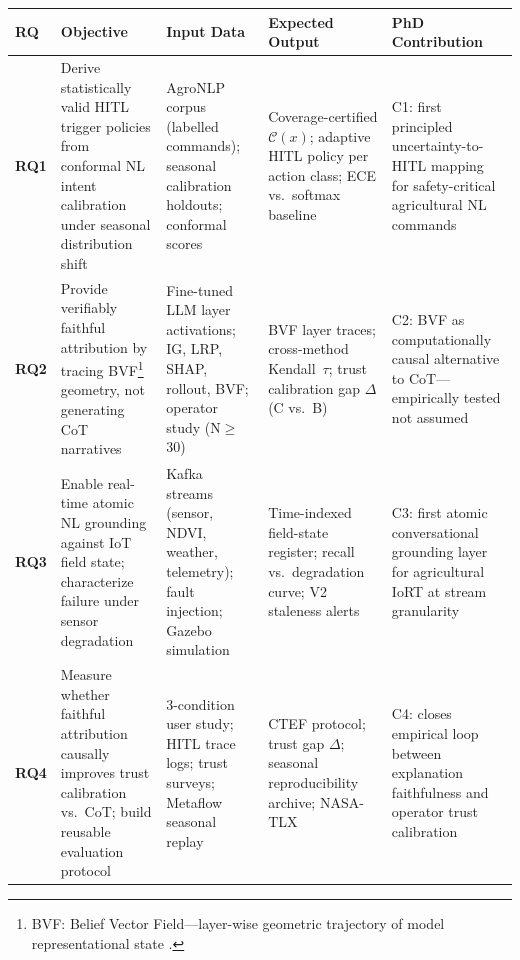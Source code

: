 \documentclass[11pt,a4paper]{article}
\begin{document}
\begin{center}
\setlength{\tabcolsep}{3pt}\scriptsize
\begin{tabularx}{\linewidth}{@{}p{0.48cm}p{2.65cm}p{2.25cm}p{2.55cm}X@{}}
\toprule
\textbf{RQ} & \textbf{Objective} & \textbf{Input Data} & \textbf{Expected Output} & \textbf{PhD Contribution} \\
\midrule
\textbf{RQ1} & Derive statistically valid HITL trigger policies from conformal NL intent calibration under seasonal distribution shift & AgroNLP corpus (labelled commands); seasonal calibration holdouts; conformal scores & Coverage-certified $\mathcal{C}(x)$; adaptive HITL policy per action class; ECE vs.\ softmax baseline & C1: first principled uncertainty-to-HITL mapping for safety-critical agricultural NL commands \\[3pt]
\textbf{RQ2} & Provide verifiably faithful attribution by tracing BVF\footnote{BVF: Belief Vector Field---layer-wise geometric trajectory of model representational state \citep{saha_bvf_2026}.} geometry, not generating CoT narratives & Fine-tuned LLM layer activations; IG, LRP, SHAP, rollout, BVF; operator study (N$\geq$30) & BVF layer traces; cross-method Kendall~$\tau$; trust calibration gap $\Delta$(C vs.\ B) & C2: BVF as computationally causal alternative to CoT---empirically tested not assumed \\[3pt]
\textbf{RQ3} & Enable real-time atomic NL grounding against IoT field state; characterize failure under sensor degradation & Kafka streams (sensor, NDVI, weather, telemetry); fault injection; Gazebo simulation & Time-indexed field-state register; recall vs.\ degradation curve; V2 staleness alerts & C3: first atomic conversational grounding layer for agricultural IoRT at stream granularity \\[3pt]
\textbf{RQ4} & Measure whether faithful attribution causally improves trust calibration vs.\ CoT; build reusable evaluation protocol & 3-condition user study; HITL trace logs; trust surveys; Metaflow seasonal replay & CTEF protocol; trust gap $\Delta$; seasonal reproducibility archive; NASA-TLX & C4: closes empirical loop between explanation faithfulness and operator trust calibration \\
\bottomrule
\end{tabularx}
\end{center}
\end{document}
